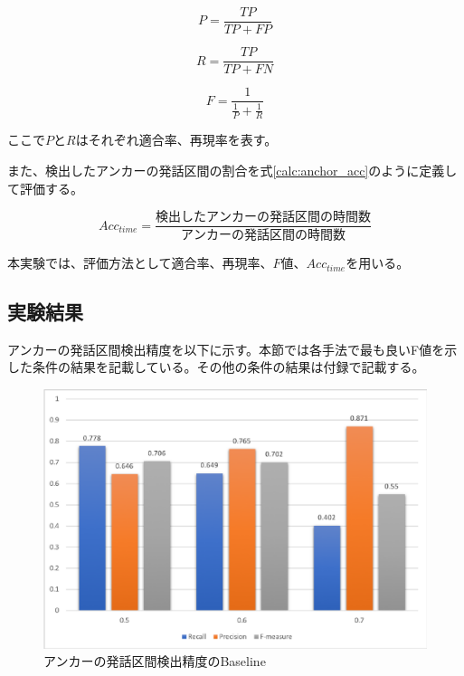 \begin{equation}
\label{calc:precision2}
P = \frac{TP}{TP + FP}
\end{equation}

\begin{equation}
\label{calc:recall2}
R = \frac{TP}{TP + FN}
\end{equation}

\begin{equation}
\label{calc:fmeasure2}
F = \frac{1}{\frac{1}{P} + \frac{1}{R}}
\end{equation}

ここで$P$と$R$はそれぞれ適合率、再現率を表す。

また、検出したアンカーの発話区間の割合を式\ref{calc:anchor_acc}のように定義して評価する。

\begin{equation}
\label{calc:anchor_acc}
Acc_{time} = \frac{検出したアンカーの発話区間の時間数}{アンカーの発話区間の時間数}
\end{equation}

本実験では、評価方法として適合率、再現率、$F$値、$Acc_{time}$を用いる。

\subsection{実験結果}
アンカーの発話区間検出精度を以下に示す。本節では各手法で最も良いF値を示した条件の結果を記載している。その他の条件の結果は付録で記載する。

\begin{figure}[H]
  \begin{center}
    \includegraphics[scale=0.8]{./figure/get_anchor_baseline.eps}
  \end{center}
  \caption{アンカーの発話区間検出精度のBaseline \label{fig:result_anchor_baseline}}
\end{figure}

